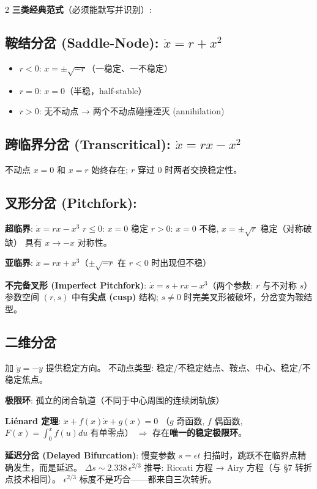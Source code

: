 \documentclass[10pt,a4paper]{article}
\newcommand{\eps}{\epsilon}
\begin{document}
\begin{multicols}{2}
\textbf{三类经典范式}（必须能默写并识别）:

\subsection*{鞍结分岔 (Saddle-Node): $\dot{x} = r + x^2$}
\begin{itemize}
\item $r < 0$: $x = \pm\sqrt{-r}$（一稳定、一不稳定）
\item $r = 0$: $x = 0$（半稳，half-stable）
\item $r > 0$: 无不动点 → 两个不动点碰撞湮灭 (annihilation)
\end{itemize}

\subsection*{跨临界分岔 (Transcritical): $\dot{x} = rx - x^2$}
不动点 $x=0$ 和 $x=r$ 始终存在;
$r$ 穿过 0 时两者交换稳定性。

\subsection*{叉形分岔 (Pitchfork):}
\textbf{超临界}: $\dot{x} = rx - x^3$\;
$r \le 0$: $x=0$ 稳定\;
$r > 0$: $x=0$ 不稳, $x=\pm\sqrt{r}$ 稳定（对称破缺）\;
具有 $x \to -x$ 对称性。

\textbf{亚临界}: $\dot{x} = rx + x^3$（$\pm\sqrt{-r}$ 在 $r<0$ 时出现但不稳）

\textbf{不完备叉形 (Imperfect Pitchfork)}:
$\dot{x} = s + rx - x^3$（两个参数: $r$ 与不对称 $s$）
参数空间 $(r,s)$ 中有\textbf{尖点 (cusp)} 结构;
$s \neq 0$ 时完美叉形被破坏，分岔变为鞍结型。

\subsection*{二维分岔}
加 $\dot{y} = -y$ 提供稳定方向。
不动点类型: 稳定/不稳定结点、鞍点、中心、稳定/不稳定焦点。

\textbf{极限环}: 孤立的闭合轨道（不同于中心周围的连续闭轨族）

\textbf{Liénard 定理}: $\ddot{x} + f(x)\dot{x} + g(x) = 0$
（$g$ 奇函数, $f$ 偶函数, $F(x)=\int_0^x f(u)du$ 有单零点）
$\Rightarrow$ 存在\textbf{唯一的稳定极限环}。

\textbf{延迟分岔 (Delayed Bifurcation)}:
慢变参数 $s = \eps t$ 扫描时，跳跃不在临界点精确发生，而是延迟。
$\boxed{\Delta s \sim 2.338\,\eps^{2/3}}$
推导: Riccati 方程 → Airy 方程（与 §7 转折点技术相同）。
$\eps^{2/3}$ 标度不是巧合——都来自三次转折。



\end{multicols}
\end{document}
